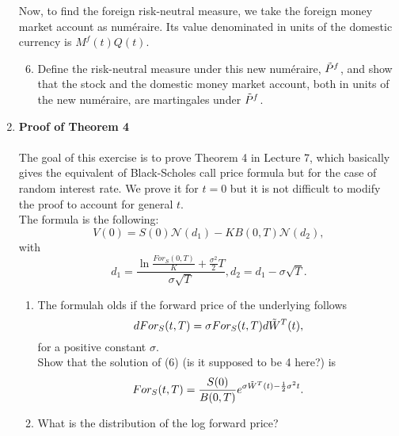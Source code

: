 \documentclass[11pt,a4,table]{article}
\begin{document}
\begin{enumerate}
    Now, to find the foreign risk-neutral measure, we take the foreign money market account as numéraire. Its value denominated in units of the domestic currency is $M^f(t)Q(t)$.
    \begin{enumerate}
        \setcounter{enumii}{5}
        
        \item Define the risk-neutral measure under this new numéraire, $\Tilde{P}^f$, and show that the stock and the domestic money market account, both in units of the new numéraire, are martingales under $\Tilde{P}^f$.
    \end{enumerate}
    
    
    \item \textbf{Proof of Theorem 4}\\
    \\
    The goal of this exercise is to prove Theorem 4 in Lecture 7, which basically gives the equivalent of Black-Scholes call price formula but for the case of random interest rate. We prove it for $t=0$ but it is not difficult to modify the proof to account for general $t$.\\
    The formula is the following:
    \begin{equation}
        V(0) = S(0)\mathcal{N}(d_1) - K B (0,T) \mathcal{N}(d_2),
    \end{equation}
    with
    \begin{equation*}
        d_1=\frac{\ln \frac{For_S(0,T)}{K}+\frac{\sigma^2}{2}T}{\sigma\sqrt{T}}, d_2 = d_1 - \sigma\sqrt{T}.
    \end{equation*}
    
    \begin{enumerate}
        \item The formulah olds if the forward price of the underlying follows
        \begin{equation}
            dFor_S(t,T) = \sigma For_S(t,T) d\Tilde{W}^T(t),
        \end{equation}
        for a positive constant $\sigma$.\\
        Show that the solution of (6) (is it supposed to be 4 here?) is
        \begin{equation}
            For_S(t,T)=\frac{S(0)}{B(0,T)}e^{\sigma\Tilde{W}^T(t)-\frac{1}{2}\sigma^2t}.
        \end{equation}
        
        \item What is the distribution of the log forward price?
        

\end{enumerate}
\end{enumerate}
\end{document}
